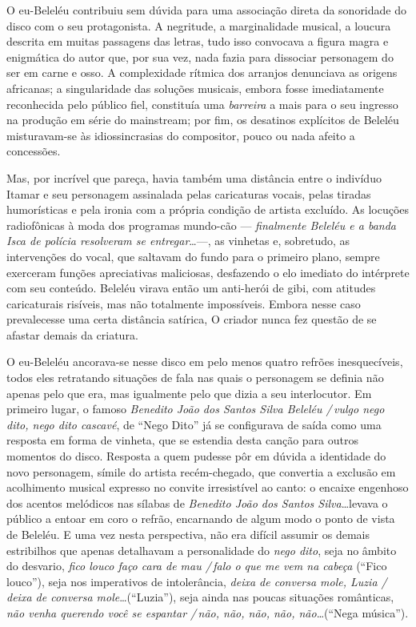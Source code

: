 O eu-Beleléu contribuiu sem dúvida para uma associação direta
da sonoridade do disco com o seu protagonista. A negritude, a
marginalidade musical, a loucura descrita em muitas passagens das
letras, tudo isso convocava a figura magra e enigmática do autor que,
por sua vez, nada fazia para dissociar personagem do ser em carne e
osso. A complexidade rítmica dos arranjos denunciava as origens
africanas; a singularidade das soluções musicais, embora fosse
imediatamente reconhecida pelo público fiel, constituía uma \textit{barreira} a
mais para o seu ingresso na produção em série do mainstream; por fim, os
desatinos explícitos de Beleléu misturavam-se às idiossincrasias do
compositor, pouco ou nada afeito a concessões.

Mas, por incrível que pareça, havia também uma distância entre o
indivíduo Itamar e seu personagem assinalada pelas caricaturas vocais,
pelas tiradas humorísticas e pela ironia com a própria condição de
artista excluído. As locuções radiofônicas à moda dos programas
mundo-cão --- \textit{finalmente Beleléu e a banda Isca de polícia resolveram se
entregar}\ldots ---, as vinhetas e, sobretudo, as intervenções do vocal, que
saltavam do fundo para o primeiro plano, sempre exerceram funções
apreciativas maliciosas, desfazendo o elo imediato do intérprete com seu
conteúdo. Beleléu virava então um anti-herói de gibi, com atitudes
caricaturais risíveis, mas não totalmente impossíveis. Embora nesse caso
prevalecesse uma certa distância satírica, O criador nunca fez questão
de se afastar demais da criatura.

O eu-Beleléu ancorava-se nesse disco em pelo menos quatro refrões
inesquecíveis, todos eles retratando situações de fala nas quais o
personagem se definia não apenas pelo que era, mas igualmente pelo que
dizia a seu interlocutor. Em primeiro lugar, o famoso \textit{Benedito João
dos Santos Silva Beleléu /\,vulgo nego dito, nego dito cascavé}, de ``Nego
Dito'' já se configurava de saída \textbar{} como uma resposta em forma de
vinheta, que se estendia desta canção para outros momentos do disco.
Resposta a quem pudesse pôr em dúvida a identidade do novo personagem,
símile do artista recém-chegado, que convertia a exclusão em acolhimento
musical expresso no convite irresistível ao canto: o encaixe engenhoso
dos acentos melódicos nas sílabas de \textit{Benedito João dos Santos
Silva}\ldots levava o público a entoar em coro o refrão, encarnando de
algum modo o ponto de vista de Beleléu. E uma vez nesta perspectiva, não
era difícil assumir os demais estribilhos que apenas detalhavam a
personalidade do \textit{nego dito}, seja no âmbito do desvario, \textit{fico louco
faço cara de mau /\,falo o que me vem na cabeça} (``Fico louco''), seja nos
imperativos de intolerância, \textbar{} \textit{deixa de conversa mole, Luzia
/\,deixa de conversa mole}\ldots (``Luzia''), seja ainda nas poucas situações
românticas, \textit{não venha querendo você se espantar /\,não, não, não, não,
não}\ldots (``Nega música'').

